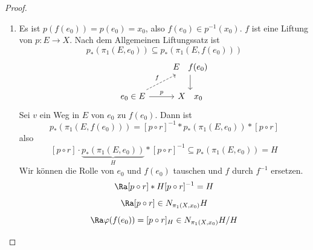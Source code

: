 \documentclass[language=ngerman]{TemplateLecture} %
\begin{document}
\begin{proof}
    \begin{enumerate}
        \item Es ist \(p(f(e_0)) = p(e_0) = x_0\), also \(f(e_0) \in p^{-1}(x_0)\). \(f\) ist eine Liftung von \(p \colon E\to X\). Nach dem Allgemeinen Liftungssatz ist
        \[p_*(\pi_1(E, e_0)) \subseteq p_*(\pi_1(E, f(e_0)))\]
        \[\begin{tikzcd}
            & E \quad f(e_0) \ar[d] \\
            e_0 \in E \ar[ru, dashed, "f"] \ar[r, "p"] & X \quad x_0
        \end{tikzcd}\]
        Sei \(v\) ein Weg in \(E\) von \(e_0\) zu \(f(e_0)\). Dann ist
        \[p_*(\pi_1(E, f(e_0))) = [p \circ r]^{-1} * p_*(\pi_1(E, e_0)) * [p \circ r]\]
        also
        \[[p \circ r] \cdot \underbrace{p_*(\pi_1(E, e_0))}_{H} * [p\circ r]^{-1} \subseteq p_*(\pi_1(E, e_0)) = H\]
        Wir können die Rolle von \(e_0\) und \(f(e_0)\) tauschen und \(f\) durch \(f^{-1}\) ersetzen.
        \[\Ra [p \circ r] * H [p \circ r]^{-1} = H\]
        \[\Ra [p \circ r] \in N_{\pi_1(X, x_0)}H\]
        \[\Ra \varphi(f(e_0)) = [p\circ r]_H \in N_{\pi_1(X, x_0)}H/H\]


\end{enumerate}
\end{proof}
\end{document}
